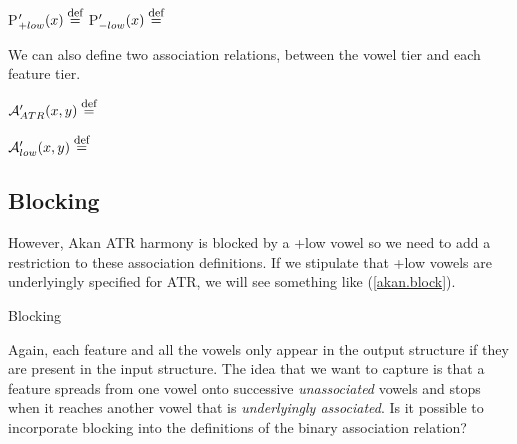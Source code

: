 \documentclass[,doc,floatsintext]{apa6}
\def\defeq{\mathrel{\buildrel \mbox{\footnotesize def} \over =}}
\theoremstyle{definition}
\theoremstyle{definition}
\theoremstyle{definition}
\theoremstyle{remark}
\begin{document}
P\('_{+low}(x) \defeq\) \hspace{2.25in} P\('_{-low}(x) \defeq\)
\vspace{0.5in}

\noindent We can also define two association relations, between the
vowel tier and each feature tier.

\(\mathcal{A}_{ATR}'(x, y) \defeq\) \vspace{0.5in}

\(\mathcal{A}_{low}'(x, y) \defeq\) \vspace{0.5in}

\subsection{Blocking}\label{blocking}

However, Akan ATR harmony is blocked by a +low vowel so we need to add a
restriction to these association definitions. If we stipulate that +low
vowels are underlyingly specified for ATR, we will see something like
(\ref{akan.block}).

\begin{exe}
  \ex \label{akan.block} Blocking\\
\end{exe}

\newpage

\noindent Again, each feature and all the vowels only appear in the
output structure if they are present in the input structure. The idea
that we want to capture is that a feature spreads from one vowel onto
successive \emph{unassociated} vowels and stops when it reaches another
vowel that is \emph{underlyingly associated}. Is it possible to
incorporate blocking into the definitions of the binary association
relation?
\end{document}
